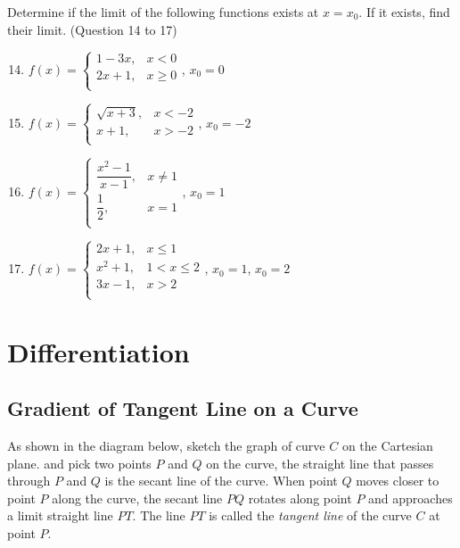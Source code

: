 \documentclass[12pt]{report}
\begin{document}
\begin{multicols}{2}
  \noindent Determine if the limit of the following functions exists at $x = x_0$. If it exists, find their limit. (Question 14 to 17)
  \begin{enumerate}
    \setcounter{enumi}{13}
    \item $f(x) = \left\{\begin{array}{rl}
              1-3x, & x < 0    \\
              2x+1, & x \geq 0 \\
            \end{array}\right.$, $x_0 = 0$
    \item $f(x) = \left\{\begin{array}{rl}
              \sqrt{x+3}, & x < -2 \\
              x+1,        & x > -2 \\
            \end{array}\right.$, $x_0 = -2$
    \item $f(x) = \left\{\begin{array}{rl}
              \dfrac{x^2 - 1}{x-1}, & x \neq 1 \\
              \dfrac{1}{2},         & x = 1    \\
            \end{array}\right.$, $x_0 = 1$
    \item $f(x) = \left\{\begin{array}{rl}
              2x + 1,  & x \leq 1     \\
              x^2 + 1, & 1 < x \leq 2 \\
              3x - 1,  & x > 2        \\
            \end{array}\right.$, $x_0 = 1$, $x_0 = 2$
  \end{enumerate}
\end{multicols}

\chapter{Differentiation}

\section{Gradient of Tangent Line on a Curve}

As shown in the diagram below, sketch the graph of curve $C$ on the Cartesian
plane. and pick two points $P$ and $Q$ on the curve, the straight line that
passes through $P$ and $Q$ is the secant line of the curve. When point $Q$
moves closer to point $P$ along the curve, the secant line $PQ$ rotates along
point $P$ and approaches a limit straight line $PT$. The line $PT$ is called
the \textit{tangent line} of the curve $C$ at point $P$.
\end{document}

